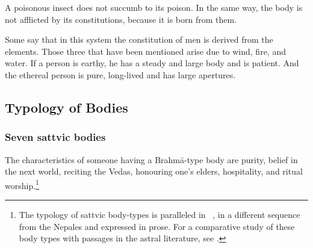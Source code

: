 \begin{translation}
\item[79]

\begin{sloka}
A poisonous insect does not succumb to its poison.  In the same way, the body is not afflicted by its constitutions, because it is born from them.
\end{sloka}
        
%


\item[80]

Some say that in this system %
the constitution of men is derived from the elements. Those three that have been mentioned arise due to wind, fire, and water. If a person is earthy, he has a steady and large body and is patient. %
And the ethereal person %
is pure, long-lived and has large apertures. %
\newpage

\subsection{Typology of Bodies}

\subsubsection{Seven sattvic bodies}

\item[81]

The characteristics of someone having a Brahmā-type body are 
purity, belief in the next world, %
reciting the Vedas, %
honouring one's elders, %
hospitality, %
and ritual worship.\footnote{The typology of sattvic body-types is
    paralleled in \CS\ , in a different sequence from 
    the Nepales and expressed in
    prose.  For a comparative study of these body types with passages
    in the astral literature, see \cite{zysk-2018}.}
    


\end{translation}
